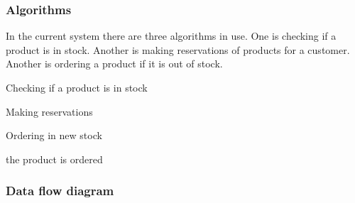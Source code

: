\subsubsection{Algorithms}
In the current system there are three algorithms in use. One is checking if a product is in stock. Another is making reservations of products for a customer. Another is ordering a product if it is out of stock.


\begin{algorithm}[H]
    \caption{Checking if a product is in stock}
\begin{algorithmic}[1]
\State
{}
    \EndIf
\EndWhile
\end{algorithmic}
\end{algorithm}


\begin{algorithm}[H]
    \caption{Making reservations}
\begin{algorithmic}[2]
\State
{}
    \EndIf
\EndWhile
\end{algorithmic}
\end{algorithm}

\begin{algorithm}[H]
    \caption{Ordering in new stock}
\begin{algorithmic}[3]
\State
{}
        the product is ordered
    \EndIf
\EndWhile
\end{algorithmic}
\end{algorithm}

\subsubsection{Data flow diagram}

